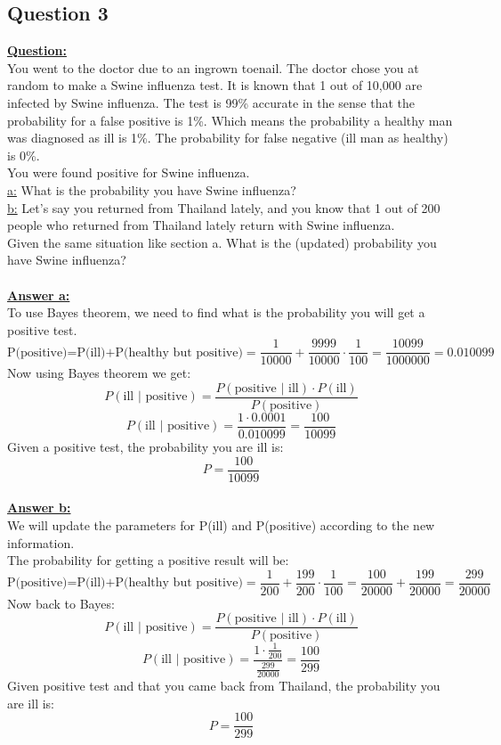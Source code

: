 \documentclass[a4, 12pt,titlepage]{scrartcl}
\begin{document}
\subsection{Question 3}
\textbf{\underline{Question:}}\\
You went to the doctor due to an ingrown toenail. The doctor chose you at random to make a Swine influenza test. It is known that 1 out of 10,000 are infected by Swine influenza. The test is 99\% accurate in the sense that the probability for a false positive is 1\%. Which means the probability a healthy man was diagnosed as ill is 1\%. The probability for false negative (ill man as healthy) is 0\%.\\
You were found positive for Swine influenza.\\

\noindent
\underline{a:} What is the probability you have Swine influenza?\\
\underline{b:} Let's say you returned from Thailand lately, and you know that 1 out of 200 people who returned from Thailand lately return with Swine influenza.\\
Given the same situation like section a. What is the (updated) probability you have Swine influenza? \\
\smallskip\\

\noindent
\textbf{\underline{Answer a:}}\\
To use Bayes theorem, we need to find what is the probability you will get a positive test. \[
\textrm{P(positive)=P(ill)+P(healthy but positive)}=\frac{1}{10000}+\frac{9999}{10000}\cdot \frac{1}{100}=\frac{10099}{1000000}=0.010099
\]
Now using Bayes theorem we get:\[
P(\textrm{ill $|$ positive})=\frac{P(\textrm{positive $|$ ill})\cdot P(\textrm{ill})}{P(\textrm{positive})}
\]
\[
P(\textrm{ill $|$ positive})=\frac{1\cdot 0.0001}{0.010099}=\frac{100}{10099}
\]
Given a positive test, the probability you are ill is:\[
\boxed{P=\frac{100}{10099}}
\]
\smallskip\\
\textbf{\underline{Answer b:}}\\
We will update the parameters for P(ill) and P(positive) according to the new information.\\
The probability for getting a positive result will be:\[
\textrm{P(positive)=P(ill)+P(healthy but positive)}=\frac{1}{200}+\frac{199}{200}\cdot \frac{1}{100}=\frac{100}{20000}+\frac{199}{20000}=\frac{299}{20000}
\]
Now back to Bayes:\[
P(\textrm{ill $|$ positive})=\frac{P(\textrm{positive $|$ ill})\cdot P(\textrm{ill})}{P(\textrm{positive})}
\]
\[
P(\textrm{ill $|$ positive})=\frac{1\cdot \frac{1}{200}}{\frac{299}{20000}}=\frac{100}{299}
\]Given positive test and that you came back from Thailand, the probability you are ill is:\[
\boxed{P=\frac{100}{299}}
\]
\newpage
\end{document}
